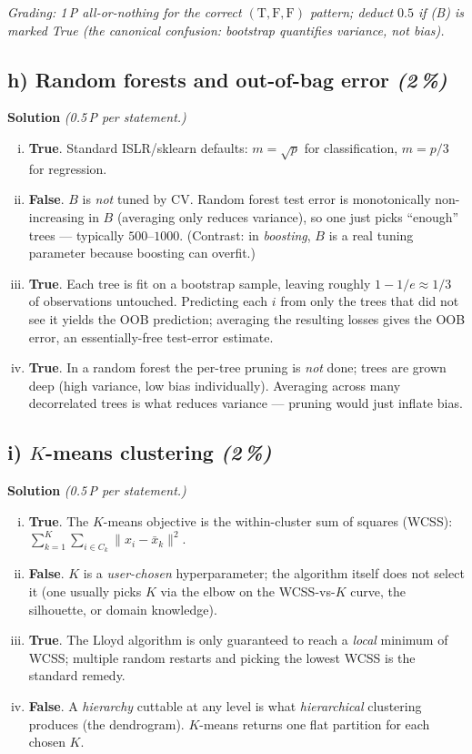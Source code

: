 \documentclass[11pt,a4paper]{article}
\newcommand{\subpoints}[1]{\textit{(#1\,\%)}}
\newcommand{\sol}{\noindent\textbf{Solution}}
\begin{document}
\noindent\emph{Grading: 1\,P all-or-nothing for the correct $(\mathrm{T}, \mathrm{F}, \mathrm{F})$ pattern; deduct
$0.5$ if (B) is marked True (the canonical confusion: bootstrap quantifies variance, not bias).}

\subsection*{h) Random forests and out-of-bag error \subpoints{2}}
\sol{} \emph{(0.5\,P per statement.)}
\begin{enumerate}[(i)]
  \item \textbf{True}. Standard ISLR/sklearn defaults: $m=\sqrt{p}$ for classification,
        $m=p/3$ for regression.
  \item \textbf{False}. $B$ is \emph{not} tuned by CV. Random forest test error is monotonically
        non-increasing in $B$ (averaging only reduces variance), so one just picks ``enough'' trees
        --- typically $500$--$1000$. (Contrast: in \emph{boosting}, $B$ is a real tuning parameter
        because boosting can overfit.)
  \item \textbf{True}. Each tree is fit on a bootstrap sample, leaving roughly $1-1/e\approx 1/3$
        of observations untouched. Predicting each $i$ from only the trees that did not see it
        yields the OOB prediction; averaging the resulting losses gives the OOB error, an
        essentially-free test-error estimate.
  \item \textbf{True}. In a random forest the per-tree pruning is \emph{not} done; trees are grown
        deep (high variance, low bias individually). Averaging across many decorrelated trees is
        what reduces variance --- pruning would just inflate bias.
\end{enumerate}

\subsection*{i) $K$-means clustering \subpoints{2}}
\sol{} \emph{(0.5\,P per statement.)}
\begin{enumerate}[(i)]
  \item \textbf{True}. The $K$-means objective is the within-cluster sum of squares (WCSS):
        $\sum_{k=1}^K\sum_{i\in C_k}\|x_i - \bar x_k\|^2$.
  \item \textbf{False}. $K$ is a \emph{user-chosen} hyperparameter; the algorithm itself does not
        select it (one usually picks $K$ via the elbow on the WCSS-vs-$K$ curve, the silhouette,
        or domain knowledge).
  \item \textbf{True}. The Lloyd algorithm is only guaranteed to reach a \emph{local} minimum of
        WCSS; multiple random restarts and picking the lowest WCSS is the standard remedy.
  \item \textbf{False}. A \emph{hierarchy} cuttable at any level is what \emph{hierarchical}
        clustering produces (the dendrogram). $K$-means returns one flat partition for each
        chosen $K$.
\end{enumerate}
\end{document}

